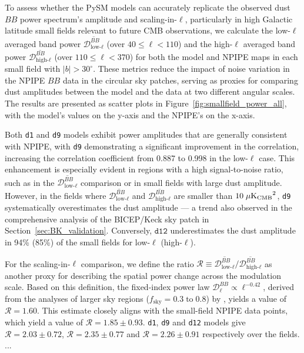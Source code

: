 \documentclass[twocolumn]{aastex631}
\begin{document}
To assess whether the PySM models can accurately replicate the observed dust $BB$ power spectrum's amplitude and scaling-in-$\ell$, particularly in high Galactic latitude small fields relevant to future CMB observations, we calculate the low-$\ell$ averaged band power $\overline{\mathcal{D}_{\text{low-}\ell}^{BB}}$ (over $40 \le \ell < 110$) and the high-$\ell$ averaged band power $\overline{\mathcal{D}_{\text{high-}\ell}^{BB}}$ (over $110 \le \ell < 370$) for both the model and NPIPE maps in each small field with $|b| > 30^\circ$. These metrics reduce the impact of noise variation in the NPIPE $BB$ data in the circular sky patches, serving as proxies for comparing dust amplitudes between the model and the data at two different angular scales. The results are presented as scatter plots in Figure~\ref{fig:smallfield_power_all}, with the model's values on the y-axis and the NPIPE's on the x-axis.

Both \texttt{d1} and \texttt{d9} models exhibit power amplitudes that are generally consistent with NPIPE, with \texttt{d9} demonstrating a significant improvement in the correlation, increasing the correlation coefficient from 0.887 to 0.998 in the low-$\ell$ case. This enhancement is especially evident in regions with a high signal-to-noise ratio, such as in the $\overline{\mathcal{D}_{\text{low-}\ell}^{BB}}$ comparison or in small fields with large dust amplitude. However, in the fields where $\overline{\mathcal{D}_{\text{low-}\ell}^{BB}}$ and $\overline{\mathcal{D}_{\text{high-}\ell}^{BB}}$ are smaller than $10 \; \mu\rm{K_{CMB}}^2$, \texttt{d9} systematically overestimates the dust amplitude --- a trend also observed in the comprehensive analysis of the BICEP/Keck sky patch in Section~\ref{sec:BK_validation}. Conversely, $\texttt{d12}$ underestimates the dust amplitude in 94\% (85\%) of the small fields for low-$\ell$ (high-$\ell$). 

For the scaling-in-$\ell$ comparison, we define the ratio $\mathcal{R} \equiv \overline{\mathcal{D}_{\text{low-}\ell}^{BB}} \Big/ \overline{\mathcal{D}_{\text{high-}\ell}^{BB}}$ as another proxy for describing the spatial power change across the modulation scale. Based on this definition, the fixed-index power law $\mathcal{D}_\ell^{BB} \propto \ell^{-0.42}$, derived from the analyses of larger sky regions ($f_\text{sky} = 0.3 \; \text{to} \; 0.8$) by \cite{planck2014-XXX}, yields a value of $\mathcal{R} = 1.60$. This estimate closely aligns with the small-field NPIPE data points, which yield a value of $\mathcal{R} = 1.85 \pm 0.93$. \texttt{d1}, \texttt{d9} and \texttt{d12} models give $\mathcal{R} = 2.03 \pm 0.72$, $\mathcal{R} = 2.35 \pm 0.77$ and $\mathcal{R} = 2.26 \pm 0.91$ respectively over the fields. ...
\end{document}

